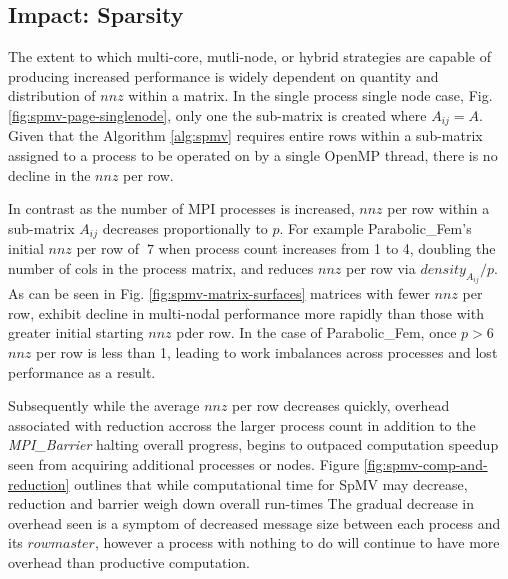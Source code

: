 \subsection{Impact: Sparsity}\label{sec:dspmv-sparsityimpact}

The extent to which multi-core, mutli-node, or hybrid strategies are capable of producing increased performance is widely dependent on quantity and distribution of $nnz$ within a matrix. In the single process single node case, Fig. \ref{fig:spmv-page-singlenode}, only one the sub-matrix is created where $A_{ij} = A$. Given that the Algorithm \ref{alg:spmv} requires entire rows within a sub-matrix assigned to a process to be operated on by a single OpenMP thread, there is no decline in the $nnz$ per row. 

In contrast as the number of MPI processes is increased, $nnz$ per row within a sub-matrix $A_{ij}$ decreases proportionally to $p$. For example Parabolic\_Fem's initial $nnz$ per row of $~7$ when process count increases from 1 to 4, doubling the number of cols in the process matrix, and reduces $nnz$ per row  via $density_{A_{ij}}/p$. As can be seen in Fig. \ref{fig:spmv-matrix-surfaces} matrices with fewer $nnz$ per row, exhibit decline in multi-nodal performance more rapidly than those with greater initial starting $nnz$ pder row. In the case of Parabolic\_Fem, once $p > 6$ $nnz$ per row is less than 1, leading to work imbalances across processes and lost performance as a result. 

Subsequently while the average $nnz$ per row decreases quickly, overhead associated with reduction accross the larger process count in addition to the \emph{MPI\_Barrier} halting overall progress, begins to outpaced computation speedup seen from acquiring additional processes or nodes. Figure \ref{fig:spmv-comp-and-reduction} outlines that while computational time for SpMV may decrease, reduction and barrier weigh down overall run-times The gradual decrease in overhead seen is a symptom of decreased message size between each process and its $row master$, however a process with nothing to do will continue to have more overhead than productive computation. 


